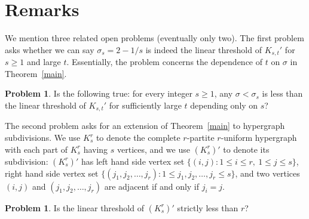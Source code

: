\documentclass[11pt]{article}
\theoremstyle{definition}
\newtheorem{problem}[theorem]{Problem}
\begin{document}

\section{Remarks}\label{sec_remark}

We mention three related open problems (eventually only two). The first problem asks whether we can say $\sigma_s = 2 -1/s$ is indeed the linear threshold of $K_{s,t}'$ for $s \geq 1$ and large $t$. Essentially, the problem concerns the dependence of $t$ on $\sigma$ in Theorem~\ref{main}.
\begin{problem}
    Is the following true: for every integer $s \geq 1$, any $\sigma < \sigma_s$ is less than the linear threshold of $K_{s,t}'$ for sufficiently large $t$ depending only on $s$?
\end{problem}

The second problem asks for an extension of Theorem~\ref{main} to hypergraph subdivisions. We use $K_s^r$ to denote the complete $r$-partite $r$-uniform hypergraph with each part of $K_s^r$ having $s$ vertices, and we use $(K_s^{r})'$ to denote its subdivision: $(K_s^{r})'$ has left hand side vertex set $\{(i,j): 1\leq i\leq r,~ 1\leq j\leq s\}$, right hand side vertex set $\{(j_1,j_2,\dots, j_r): 1\leq j_1,j_2,\dots,j_r \leq s\}$, and two vertices $(i,j)$ and $(j_1,j_2,\dots, j_r)$ are adjacent if and only if $j_i = j$.
\begin{problem}\label{hypergraph}
    Is the linear threshold of $(K_s^{r})'$ strictly less than $r$?
\end{problem}
\end{document}
